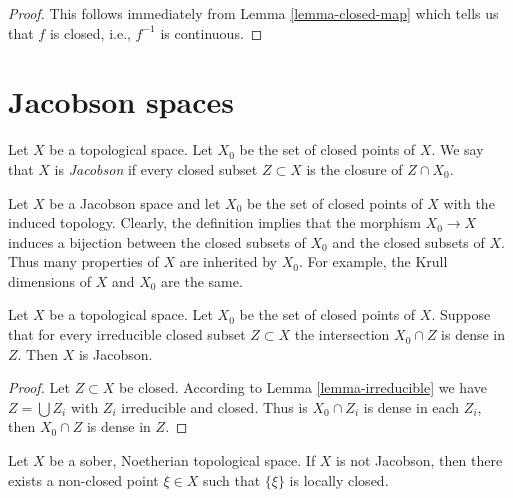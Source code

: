 \begin{proof}
This follows immediately from Lemma \ref{lemma-closed-map}
which tells us that $f$ is closed, i.e., $f^{-1}$ is
continuous.
\end{proof}













\section{Jacobson spaces}
\label{section-space-jacobson}

\begin{definition}
\label{definition-space-jacobson}
Let $X$ be a topological space.
Let $X_0$ be the set of closed points of $X$.
We say that $X$ is {\it Jacobson} if every
closed subset $Z \subset X$ is the closure
of $Z \cap X_0$.
\end{definition}

\noindent
Let $X$ be a Jacobson space and let $X_0$ be the set
of closed points of $X$ with the induced topology.
Clearly, the definition implies that the morphism
$X_0 \to X$ induces a bijection between the closed
subsets of $X_0$ and the closed subsets of $X$.
Thus many properties of $X$ are inherited by $X_0$.
For example, the Krull dimensions of $X$ and $X_0$
are the same.

\begin{lemma}
\label{lemma-jacobson-check-irreducible-closed}
Let $X$ be a topological space. Let $X_0$ be the set
of closed points of $X$.
Suppose that for every irreducible closed subset $Z \subset X$
the intersection $X_0 \cap Z$ is dense in $Z$.
Then $X$ is Jacobson.
\end{lemma}

\begin{proof}
Let $Z \subset X$ be closed. According to Lemma \ref{lemma-irreducible}
we have $Z = \bigcup Z_i$ with $Z_i$ irreducible and closed.
Thus is $X_0 \cap Z_i$ is dense in each $Z_i$, then $X_0 \cap Z$
is dense in $Z$.
\end{proof}

\begin{lemma}
\label{lemma-non-jacobson-Noetherian-characterize}
Let $X$ be a sober, Noetherian topological space.
If $X$ is not Jacobson, then there exists a non-closed point
$\xi \in X$ such that $\{\xi\}$ is locally closed.
\end{lemma}

